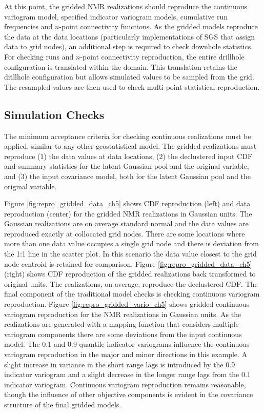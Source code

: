 At this point, the gridded \gls{NMR} realizations should reproduce the continuous variogram model, specified indicator variogram models, cumulative run frequencies and $n$-point connectivity functions. As the gridded models reproduce the data at the data locations (particularly implementations of \gls{SGS} that assign data to grid nodes), an additional step is required to check downhole statistics. For checking runs and $n$-point connectivity reproduction, the entire drillhole configuration is translated within the domain. This translation retains the drillhole configuration but allows simulated values to be sampled from the grid. The resampled values are then used to check multi-point statistical reproduction.

\FloatBarrier
\subsection{Simulation Checks}
\label{subsec:simcheck}

The minimum acceptance criteria for checking continuous realizations \citep{leuangthong2004minimum} must be applied, similar to any other geostatistical model. The gridded realizations must reproduce (1) the data values at data locations, (2) the declustered input \gls{CDF} and summary statistics for the latent Gaussian pool and the original variable, and (3) the input covariance model, both for the latent Gaussian pool and the original variable.

Figure \ref{fig:repro_gridded_data_ch5} shows \gls{CDF} reproduction (left) and data reproduction (center) for the gridded \gls{NMR} realizations in Gaussian units. The Gaussian realizations are on average standard normal and the data values are reproduced exactly at collocated grid nodes. There are some locations where more than one data value occupies a single grid node and there is deviation from the 1:1 line in the scatter plot. In this scenario the data value closest to the grid node centroid is retained for comparison. Figure \ref{fig:repro_gridded_data_ch5} (right) shows \gls{CDF} reproduction of the gridded realizations back transformed to original units. The realizations, on average, reproduce the declustered \gls{CDF}. The final component of the traditional model checks is checking continuous variogram reproduction. Figure \ref{fig:repro_gridded_vario_ch5} shows gridded continuous variogram reproduction for the \gls{NMR} realizations in Gaussian units. As the realizations are generated with a mapping function that considers multiple variogram components there are some deviations from the input continuous model. The 0.1 and 0.9 quantile indicator variograms influence the continuous variogram reproduction in the major and minor directions in this example. A slight increase in variance in the short range lags is introduced by the 0.9 indicator variogram and a slight decrease in the longer range lags from the 0.1 indicator variogram. Continuous variogram reproduction remains reasonable, though the influence of other objective components is evident in the covariance structure of the final gridded models.

